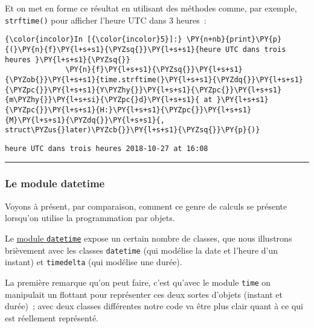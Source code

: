     Et on met en forme ce résultat en utilisant des méthodes comme, par
exemple, \texttt{strftime()} pour afficher l'heure UTC dans 3 heures~:

    \begin{Verbatim}[commandchars=\\\{\},frame=single,framerule=0.3mm,rulecolor=\color{cellframecolor}]
{\color{incolor}In [{\color{incolor}5}]:} \PY{n+nb}{print}\PY{p}{(}\PY{n}{f}\PY{l+s+s1}{\PYZsq{}}\PY{l+s+s1}{heure UTC dans trois heures }\PY{l+s+s1}{\PYZsq{}}
              \PY{n}{f}\PY{l+s+s1}{\PYZsq{}}\PY{l+s+s1}{\PYZob{}}\PY{l+s+s1}{time.strftime(}\PY{l+s+s1}{\PYZdq{}}\PY{l+s+s1}{\PYZpc{}}\PY{l+s+s1}{Y\PYZhy{}}\PY{l+s+s1}{\PYZpc{}}\PY{l+s+s1}{m\PYZhy{}}\PY{l+s+si}{\PYZpc{}d}\PY{l+s+s1}{ at }\PY{l+s+s1}{\PYZpc{}}\PY{l+s+s1}{H:}\PY{l+s+s1}{\PYZpc{}}\PY{l+s+s1}{M}\PY{l+s+s1}{\PYZdq{}}\PY{l+s+s1}{, struct\PYZus{}later)\PYZcb{}}\PY{l+s+s1}{\PYZsq{}}\PY{p}{)}
\end{Verbatim}


    \begin{Verbatim}[commandchars=\\\{\},frame=single,framerule=0.3mm,rulecolor=\color{cellframecolor}]
heure UTC dans trois heures 2018-10-27 at 16:08
\end{Verbatim}

    \begin{center}\rule{0.5\linewidth}{\linethickness}\end{center}

    \hypertarget{le-module-datetime}{%
\subsubsection{Le module datetime}\label{le-module-datetime}}

    Voyons à présent, par comparaison, comment ce genre de calculs se
présente lorsqu'on utilise la programmation par objets.

Le \href{https://docs.python.org/3/library/datetime.html}{module
\texttt{datetime}} expose un certain nombre de classes, que nous
illustrons brièvement avec les classes \texttt{datetime} (qui modélise
la date et l'heure d'un instant) et \texttt{timedelta} (qui modélise une
durée).

La première remarque qu'on peut faire, c'est qu'avec le module
\texttt{time} on manipulait un flottant pour représenter ces deux sortes
d'objets (instant et durée)~; avec deux classes différentes notre code
va être plus clair quant à ce qui est réellement représenté.

